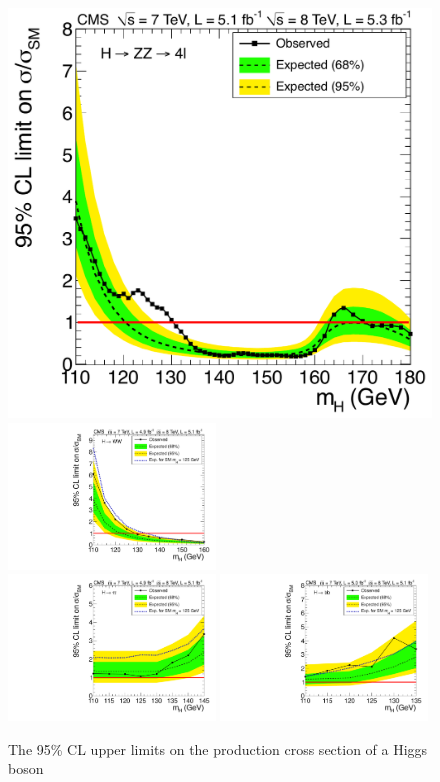\documentclass[11pt,twoside,a4paper,cmspaper,final,collab]{cms-tdr}
\begin{document}
\begin{figure}[htbp]
    \begin{center}
 \includegraphics[width=0.49\linewidth]{figures/comb/sqr_acls_hzz_zoom} \includegraphics[width=0.49\textwidth]{figures/comb/sqr_acls_hww_nominal_inject2_ylin} \\
 \includegraphics[width=0.49\textwidth]{figures/comb/sqr_acls_htt_nominal_inject2_ylin}
 \includegraphics[width=0.49\textwidth]{figures/comb/sqr_acls_hbb_nominal_inject2_ylin}
     \caption{The 95\% CL upper limits
on the production cross section of a Higgs boson
}
\end{center}
\end{figure}
\end{document}
